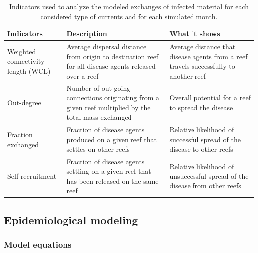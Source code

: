 \begin{table}
    \centering
    \begin{tabular}{|p{3cm}|p{4cm}|p{3.5cm}|}
        \hline
        \textbf{Indicators} & \textbf{Description} & \textbf{What it shows} \\
        \hline
            Weighted connectivity length (WCL) & 
            Average dispersal distance from origin to destination reef for all disease agents released over a reef & 
            Average distance that disease agents from a reef travels successfully to another reef \\
        \hline
            Out-degree &
            Number of out-going connections originating from a given reef multiplied by the total mass exchanged  &
            Overall potential for a reef to spread the disease \\
        \hline
            Fraction exchanged &
            Fraction of disease agents produced on a given reef that settles on other reefs &
            Relative likelihood of successful spread of the disease to other reefs  \\
        \hline
            Self-recruitment &
            Fraction of disease agents settling on a given reef that has been released on the same reef &
            Relative likelihood of unsuccessful spread of the disease from other reefs \\
        \hline            
    \end{tabular}
    \caption{Indicators used to analyze the modeled exchanges of infected material for each considered type of currents and for each simulated month.}
    \label{tab:indicator}
\end{table}

\subsection{Epidemiological modeling}

\subsubsection{Model equations}

